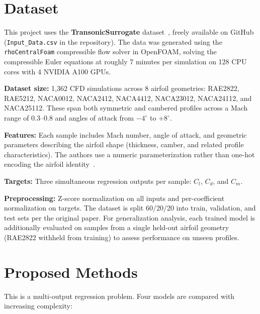 \documentclass[11pt]{article}
\begin{document}
\section{Dataset}

This project uses the \textbf{TransonicSurrogate}
dataset~\cite{elrefaie2024}, freely available on GitHub
(\texttt{Input\_Data.csv} in the repository). The data was generated
using the \texttt{rhoCentralFoam} compressible flow solver in
OpenFOAM, solving the compressible Euler equations at roughly 7 minutes
per simulation on 128 CPU cores with 4 NVIDIA A100 GPUs.

\textbf{Dataset size:} 1,362 CFD simulations across 8 airfoil
geometries: RAE2822, RAE5212, NACA0012, NACA2412, NACA4412, NACA23012,
NACA24112, and NACA25112. These span both symmetric and cambered
profiles across a Mach range of 0.3--0.8 and angles of attack from
$-4^\circ$ to $+8^\circ$.

\textbf{Features:} Each sample includes Mach number, angle of attack,
and geometric parameters describing the airfoil shape (thickness,
camber, and related profile characteristics). The authors use a
numeric parameterization rather than one-hot encoding the airfoil
identity~\cite{elrefaie2024}.

\textbf{Targets:} Three simultaneous regression outputs per sample:
$C_l$, $C_d$, and $C_m$.

\textbf{Preprocessing:} Z-score normalization on all inputs and
per-coefficient normalization on targets. The dataset is split 60/20/20
into train, validation, and test sets per the original paper.
For generalization analysis, each trained model is additionally
evaluated on samples from a single held-out airfoil geometry (RAE2822
withheld from training) to assess performance on unseen profiles.

\section{Proposed Methods}

This is a multi-output regression problem. Four models are compared
with increasing complexity:
\end{document}
